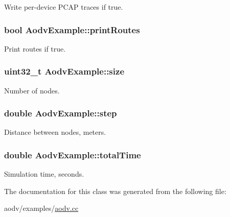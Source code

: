Write per-\/device P\+C\+AP traces if true. 

\subsubsection[{\texorpdfstring{print\+Routes}{printRoutes}}]{\setlength{\rightskip}{0pt plus 5cm}bool Aodv\+Example\+::print\+Routes\hspace{0.3cm}{\ttfamily [private]}}\hypertarget{classAodvExample_a51ce8d78ff5c5e9725038d3c6fd29a33}{}\label{classAodvExample_a51ce8d78ff5c5e9725038d3c6fd29a33}


Print routes if true. 

\subsubsection[{\texorpdfstring{size}{size}}]{\setlength{\rightskip}{0pt plus 5cm}uint32\+\_\+t Aodv\+Example\+::size\hspace{0.3cm}{\ttfamily [private]}}\hypertarget{classAodvExample_a981713615ce1e6eaf66fe20c0fae3136}{}\label{classAodvExample_a981713615ce1e6eaf66fe20c0fae3136}


Number of nodes. 

\subsubsection[{\texorpdfstring{step}{step}}]{\setlength{\rightskip}{0pt plus 5cm}double Aodv\+Example\+::step\hspace{0.3cm}{\ttfamily [private]}}\hypertarget{classAodvExample_af2cfac181b97285129c0d17a5edd66f0}{}\label{classAodvExample_af2cfac181b97285129c0d17a5edd66f0}


Distance between nodes, meters. 

\subsubsection[{\texorpdfstring{total\+Time}{totalTime}}]{\setlength{\rightskip}{0pt plus 5cm}double Aodv\+Example\+::total\+Time\hspace{0.3cm}{\ttfamily [private]}}\hypertarget{classAodvExample_a842f2dbbf8a6e4e33c275cbfa2d20bf2}{}\label{classAodvExample_a842f2dbbf8a6e4e33c275cbfa2d20bf2}


Simulation time, seconds. 



The documentation for this class was generated from the following file\+:\begin{DoxyCompactItemize}
\item 
aodv/examples/\hyperlink{aodv_8cc}{aodv.\+cc}\end{DoxyCompactItemize}
